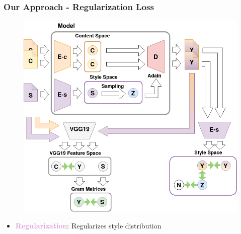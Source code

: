 \documentclass[11pt,xcolor=dvipsnames]{beamer}
\begin{document}
\begin{frame}
  \addtocounter{framenumber}{-1}
\frametitle{Our Approach - Regularization Loss}
\begin{figure}
\centering
\includegraphics[scale=0.3]{pipelinefull.png}
\end{figure}


\begin{itemize}
	\item \textcolor{Plum}{\textbf{Regularization}}: Regularizes style distribution
	\vspace{10pt}
\end{itemize}

\end{frame}
\end{document}
